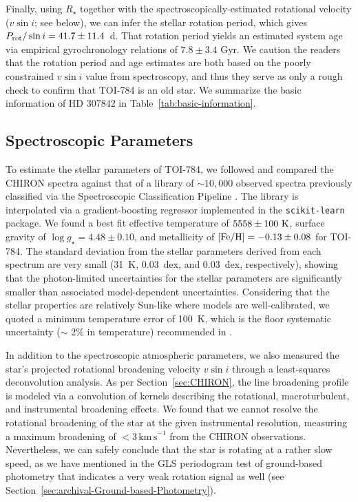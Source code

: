 \documentclass[twocolumn]{aastex631}
\newcommand{\code}[1]{{\texttt{#1}}}
\begin{document}
Finally, using $R_\star$ together with the spectroscopically-estimated rotational velocity ($v\sin i$; see below), we can infer the stellar rotation period, which gives $P_{\rm rot} / \sin i = 41.7 \pm 11.4$~d. That rotation period yields an estimated system age via empirical gyrochronology relations \citep{Mamajek2008} of $7.8 \pm 3.4$ Gyr. We caution the readers that the rotation period and age estimates are both based on the poorly constrained $v\sin i$ value from spectroscopy, and thus they serve as only a rough check to confirm that TOI-784 is an old star. We summarize the basic information of HD 307842 in Table~\ref{tab:basic-information}.


\subsection{Spectroscopic Parameters}
\label{sec:spectroscopic-pars}

To estimate the stellar parameters of TOI-784, we followed \citet{Zhou2020} and compared the CHIRON spectra against that of a library of $\sim 10,000$ observed spectra previously classified via the Spectroscopic Classification Pipeline \citep[SPC;][]{spc_Buchhave2012}. The library is interpolated via a gradient-boosting regressor implemented in the \code{scikit-learn} package. We found a best fit effective temperature of $5558\pm 100\ \rm{K}$, surface gravity of $\log g_{\star} = 4.48\pm 0.10$, and metallicity of $\rm{[Fe/H]} = -0.13\pm 0.08$ for TOI-784. The standard deviation from the stellar parameters derived from each spectrum are very small (31~K, 0.03~dex, and 0.03~dex, respectively), showing that the photon-limited uncertainties for the stellar parameters are significantly smaller than associated model-dependent uncertainties. Considering that the stellar properties are relatively Sun-like where models are well-calibrated, we quoted a minimum temperature error of 100~K, which is the floor systematic uncertainty ($\sim$ 2\% in temperature) recommended in \cite{Tayar2022}.

In addition to the spectroscopic atmospheric parameters, we also measured the star's projected rotational broadening velocity $v\sin{i}$ through a least-squares deconvolution analysis. As per Section~\ref{sec:CHIRON}, the line broadening profile is modeled via a convolution of kernels describing the rotational, macroturbulent, and instrumental broadening effects. We found that we cannot resolve the rotational broadening of the star at the given instrumental resolution, measuring a maximum broadening of $<3\,\mathrm{km\,s}^{-1}$ from the CHIRON observations. Nevertheless, we can safely conclude that the star is rotating at a rather slow speed, as we have mentioned in the GLS periodogram test of ground-based photometry that indicates a very weak rotation signal as well (see Section~\ref{sec:archival-Ground-based-Photometry}). 
\end{document}
